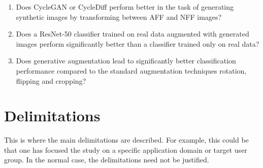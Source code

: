 \begin{enumerate}
\item Does CycleGAN or CycleDiff perform better in the task of generating synthetic
images by transforming between AFF and NFF images?

\item Does a ResNet-50 classifier trained on real data augmented with generated images perform significantly 
better than a classifier trained only on real data?

\item Does generative augmentation lead to significantly better classification performance compared 
to the standard augmentation techniques rotation, flipping and cropping?

\end{enumerate}


\section{Delimitations}
\label{sec:delimitations}

This is where the main delimitations are described. For
example, this could be that one has focused the study on a
specific application domain or target user group. In the
normal case, the delimitations need not be justified.




